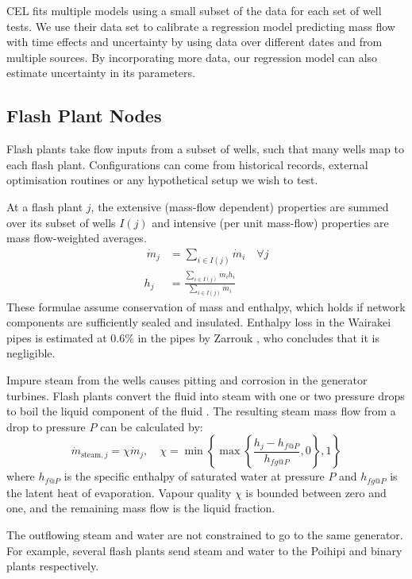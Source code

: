 \documentclass[a4paper, 12pt]{article}
\newlength{\drop}
\begin{document}
CEL fits multiple models using a small subset of the data for each set of well tests. We use their data set to calibrate a regression model predicting mass flow with time effects and uncertainty by using data over different dates and from multiple sources. By incorporating more data, our regression model can also estimate uncertainty in its parameters.

\subsection{Flash Plant Nodes}
Flash plants take flow inputs from a subset of wells, such that many wells map to each flash plant. Configurations can come from historical records, external optimisation routines or any hypothetical setup we wish to test.

At a flash plant $j$, the extensive (mass-flow dependent) properties are summed over its subset of wells $I(j)$ and intensive (per unit mass-flow) properties are mass flow-weighted averages.
\begin{align} \
\dot{m}_j &= \sum_{i\in I(j)} \dot{m}_i\quad \forall j \label{eq:fp_mf} \\
h_j &= \frac{\sum_{i\in I(j)} \dot{m}_i h_i}{\sum_{i\in I(j)} \dot{m}_i} \label{eq:fp_h}
\end{align}
These formulae assume conservation of mass and enthalpy, which holds if network components are sufficiently sealed and insulated. Enthalpy loss in the Wairakei pipes is estimated at 0.6\% in the pipes by Zarrouk \cite{Zarrouk:2014}, who concludes that it is negligible.

Impure steam from the wells causes pitting and corrosion in the generator turbines. Flash plants convert the fluid into steam with one or two pressure drops to boil the liquid component of the fluid \cite{Grant:2011}. The resulting steam mass flow from a drop to pressure $P$ can be calculated by:
\begin{equation}
\dot{m}_{\text{steam},j} = \chi\dot{m}_j,\quad \chi= \min{\left\{\max{\left\{\frac{h_j - h_{f@P}}{h_{fg@P}}, 0\right\}}, 1\right\}}
\end{equation}
where $h_{f@P}$ is the specific enthalpy of saturated water at pressure $P$ and $h_{fg@P}$ is the latent heat of evaporation. Vapour quality $\chi$ is bounded between zero and one, and the remaining mass flow is the liquid fraction.

The outflowing steam and water are not constrained to go to the same generator. For example, several flash plants send steam and water to the Poihipi and binary plants respectively.
\end{document}
